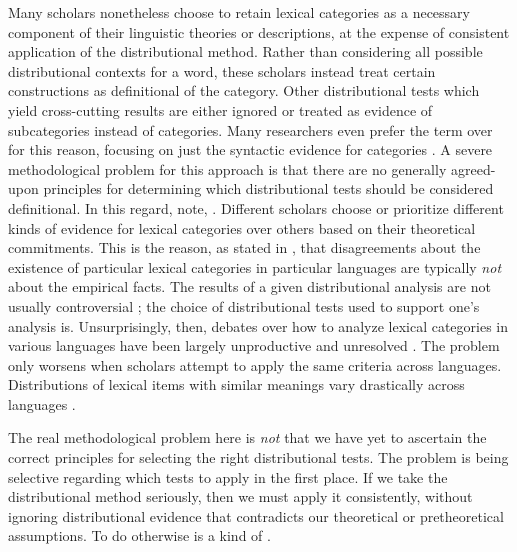 Many scholars nonetheless choose to retain lexical categories as a necessary component of their linguistic theories or descriptions, at the expense of consistent application of the distributional method. Rather than considering all possible distributional contexts for a word, these scholars instead treat certain constructions as definitional of the category. Other distributional tests which yield cross-cutting results are either ignored or treated as evidence of subcategories instead of categories. Many researchers even prefer the term  over  for this reason, focusing on just the syntactic evidence for categories \parencites{Baker2003}{Rauh2010}. A severe methodological problem for this approach is that there are no generally agreed-upon principles for determining which distributional tests should be considered definitional. In this regard, \textcite[4]{SchachterShopen2007} note,  . Different scholars choose or prioritize different kinds of evidence for lexical categories over others based on their theoretical commitments. This is the reason, as stated in , that disagreements about the existence of particular lexical categories in particular languages are typically \emph{not} about the empirical facts. The results of a given distributional analysis are not usually controversial ; the choice of distributional tests used to support one's analysis is. Unsurprisingly, then, debates over how to analyze lexical categories in various languages have been largely unproductive and unresolved \parencite[435]{Croft2005}. The problem only worsens when scholars attempt to apply the same criteria across languages. Distributions of lexical items with similar meanings vary drastically across languages \parencite[§1.4.1]{Croft2001b}.

The real methodological problem here is \emph{not} that we have yet to ascertain the correct principles for selecting the right distributional tests. The problem is being selective regarding which tests to apply in the first place. If we take the distributional method seriously, then we must apply it consistently, without ignoring distributional evidence that contradicts our theoretical or pretheoretical assumptions. To do otherwise is a kind of  \parencite[30, 41]{Croft2001b}.

